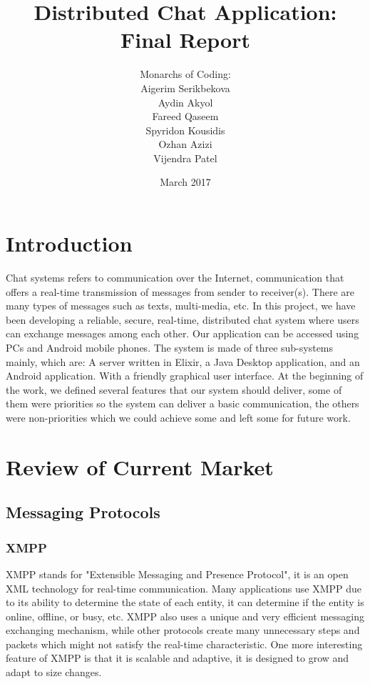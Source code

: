 \documentclass[11pt,a4paper]{report}
\begin{document}
\title{Distributed Chat Application: Final Report}
\author{Monarchs of Coding:\\
  Aigerim Serikbekova\\
  Aydin Akyol\\
  Fareed Qaseem\\
  Spyridon Kousidis\\
  Ozhan Azizi\\
  Vijendra Patel}
\date{March 2017}
\maketitle

\tableofcontents


\chapter{Introduction}

Chat systems refers to communication over the Internet, communication that offers a real-time transmission of messages from sender to receiver(s). There are many types of messages such as texts, multi-media, etc. In this project, we have been developing a reliable, secure, real-time, distributed chat system where users can exchange messages among each other. Our application can be accessed using PCs and Android mobile phones.
The system is made of three sub-systems mainly, which are: A server written in Elixir, a Java Desktop application, and an Android application. With a friendly graphical user interface.
At the beginning of the work, we defined several features that our system should deliver, some of them were priorities so the system can deliver a basic communication, the others were non-priorities which we could achieve some and left some for future work.

\chapter{Review of Current Market}

\section{Messaging Protocols}

\subsection{XMPP}
XMPP stands for "Extensible Messaging and Presence Protocol", it is an open XML technology for real-time communication. Many applications use XMPP due to its ability to determine the state of each entity, it can determine if the entity is online, offline, or busy, etc. XMPP also uses a unique and very efficient messaging exchanging mechanism, while other protocols create many unnecessary steps and packets which might not satisfy the real-time characteristic. One more interesting feature of XMPP is that it is scalable and adaptive, it is designed to grow and adapt to size changes.
\end{document}
